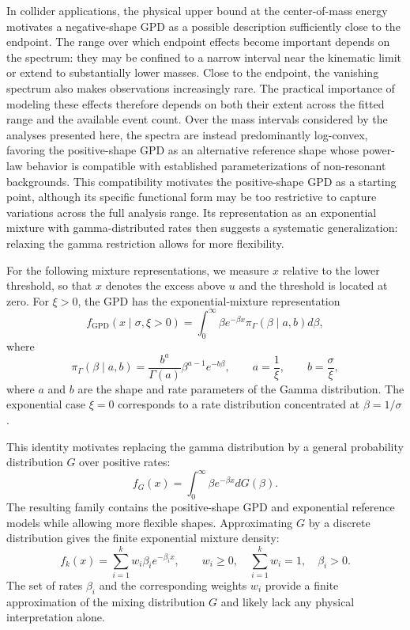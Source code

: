 \documentclass[a4paper,11pt]{article}
\begin{document}
In collider applications, the physical upper bound at the center-of-mass energy motivates a negative-shape GPD as a possible description sufficiently close to the endpoint. The range over which endpoint effects become important depends on the spectrum: they may be confined to a narrow interval near the kinematic limit or extend to substantially lower masses. Close to the endpoint, the vanishing spectrum also makes observations increasingly rare. The practical importance of modeling these effects therefore depends on both their extent across the fitted range and the available event count. Over the mass intervals considered by the analyses presented here, the spectra are instead predominantly log-convex, favoring the positive-shape GPD as an alternative reference shape whose power-law behavior is compatible with established parameterizations of non-resonant backgrounds. This compatibility motivates the positive-shape GPD as a starting point, although its specific functional form may be too restrictive to capture variations across the full analysis range. Its representation as an exponential mixture with gamma-distributed rates then suggests a systematic generalization: relaxing the gamma restriction allows for more flexibility.

For the following mixture representations, we measure $x$ relative to the lower threshold, so that $x$ denotes the excess above $u$ and the threshold is located at zero. For $\xi>0$, the GPD has the exponential-mixture representation
$$
f_{\text{GPD}}(x\mid\sigma,\xi>0)
=\int_0^\infty \beta e^{-\beta x}
\pi_\Gamma(\beta\mid a,b) d\beta,
$$
where
$$
\pi_\Gamma(\beta\mid a,b)
=\frac{b^a}{\Gamma(a)}\beta^{a-1}e^{-b\beta},
\qquad
a=\frac{1}{\xi},\qquad b=\frac{\sigma}{\xi},
$$
where $a$ and $b$ are the shape and rate parameters of the Gamma distribution. The exponential case $\xi=0$ corresponds to a rate distribution concentrated at $\beta=1/\sigma$.

This identity motivates replacing the gamma distribution by a general probability distribution $G$ over positive rates:
$$
f_G(x)=\int_0^\infty \beta e^{-\beta x} dG(\beta).
$$
The resulting family contains the positive-shape GPD and exponential reference models while allowing more flexible shapes. Approximating $G$ by a discrete distribution gives the finite exponential mixture density:
$$
f_k(x)=\sum_{i=1}^{k}w_i\beta_i e^{-\beta_i x},
\qquad
w_i\geq0,\quad \sum_{i=1}^{k}w_i=1,\quad \beta_i>0.
$$
The set of rates $\beta_i$ and the corresponding weights $w_i$ provide a finite approximation of the mixing distribution $G$ and likely lack any physical interpretation alone.
\end{document}
